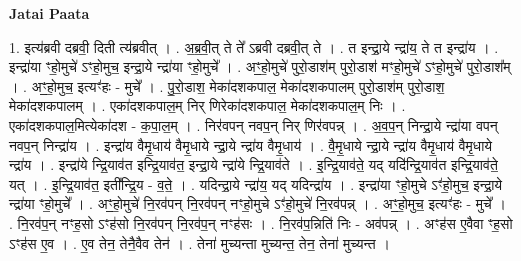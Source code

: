 \documentclass[17pt]{extarticle}
\begin{document}
\textbf{Jatai Paata} \newline

1. इत्य॑ब्रवी दब्रवी॒ दिती त्य॑ब्रवीत् । . अ॒ब्र॒वी॒त् ते ते᳚ ऽब्रवी दब्रवी॒त् ते । . त इन्द्रा॒ये न्द्रा॑य॒ ते त इन्द्रा॑य । . इन्द्रा॑या ꣳहो॒मुचे॑ ऽꣳहो॒मुच॒ इन्द्रा॒ये न्द्रा॑या ꣳहो॒मुचे᳚ । . अꣳ॒॒हो॒मुचे॑ पुरो॒डाश॑म् पुरो॒डाश॑ मꣳहो॒मुचे॑ ऽꣳहो॒मुचे॑ पुरो॒डाश᳚म् । . अꣳ॒॒हो॒मुच॒ इत्यꣳ॑हः - मुचे᳚ । . पु॒रो॒डाश॒ मेका॑दशकपाल॒ मेका॑दशकपालम् पुरो॒डाश॑म् पुरो॒डाश॒ मेका॑दशकपालम् । . एका॑दशकपाल॒म् निर् णिरेका॑दशकपाल॒ मेका॑दशकपाल॒म् निः । . एका॑दशकपाल॒मित्येका॑दश - क॒पा॒ल॒म् । . निर॑वपन् नवप॒न् निर् णिर॑वपन्न् । . अ॒व॒प॒न् निन्द्रा॒ये न्द्रा॑या वपन् नवप॒न् निन्द्रा॑य । . इन्द्रा॑य वैमृ॒धाय॑ वैमृ॒धाये न्द्रा॒ये न्द्रा॑य वैमृ॒धाय॑ । . वै॒मृ॒धाये न्द्रा॒ये न्द्रा॑य वैमृ॒धाय॑ वैमृ॒धाये न्द्रा॑य । . इन्द्रा॑ये न्द्रि॒याव॑त इन्द्रि॒याव॑त॒ इन्द्रा॒ये न्द्रा॑ये न्द्रि॒याव॑ते । . इ॒न्द्रि॒याव॑ते॒ यद् यदि॑न्द्रि॒याव॑त इन्द्रि॒याव॑ते॒ यत् । . इ॒न्द्रि॒याव॑त॒ इती᳚न्द्रि॒य - व॒ते॒ । . यदिन्द्रा॒ये न्द्रा॑य॒ यद् यदिन्द्रा॑य । . इन्द्रा॑या ꣳहो॒मुचे ऽꣳ॑हो॒मुच॒ इन्द्रा॒ये न्द्रा॑या ꣳहो॒मुचे᳚ । . अꣳ॒॒हो॒मुचे॑ नि॒रव॑पन् नि॒रव॑पन् नꣳहो॒मुचे ऽꣳ॑हो॒मुचे॑ नि॒रव॑पन्न् । . अꣳ॒॒हो॒मुच॒ इत्यꣳ॑हः - मुचे᳚ । . नि॒रव॑प॒न् नꣳह॒सो ऽꣳह॑सो नि॒रव॑पन् नि॒रव॑प॒न् नꣳह॑सः । . नि॒रव॑प॒न्निति॑ निः - अव॑पन्न् । . अꣳह॑स ए॒वैवा ꣳह॒सो ऽꣳह॑स ए॒व । . ए॒व तेन॒ तेनै॒वैव तेन॑ । . तेना॑ मुच्यन्ता मुच्यन्त॒ तेन॒ तेना॑ मुच्यन्त । \newline
\end{document}
